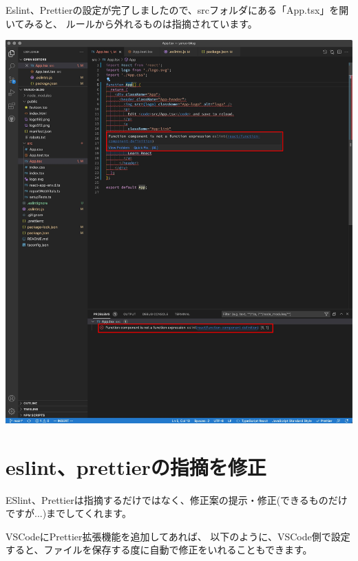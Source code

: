 Eslint、Prettierの設定が完了しましたので、srcフォルダにある「App.tsx」を開いてみると、
ルールから外れるものは指摘されています。

\begin{reviewimage}[H]%
\includegraphics[width=1.0\maxwidth]{./images/02-create-react-app/032_app_tsx_error.png}%
\label{image:02-create-react-app:032_app_tsx_error}
\end{reviewimage}

\section{eslint、prettierの指摘を修正}
\keeplastskip{
  \label{sec:2-5}
  \label{sec-04fix}
  \par\nobreak
}

ESlint、Prettierは指摘するだけではなく、修正案の提示・修正(できるものだけですが...)までしてくれます。

\vspace*{\baselineskip}

VSCodeにPrettier拡張機能を追加してあれば、
以下のように、VSCode側で設定すると、ファイルを保存する度に自動で修正をいれることもできます。

